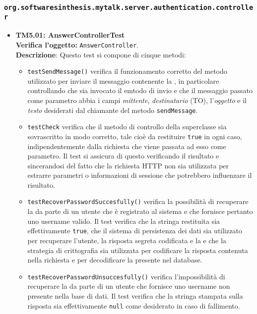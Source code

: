 \subsubsection{\texttt{org.softwaresinthesis.mytalk.server.authentication.controller}}
\begin{itemize}

\item \textbf{TM5.01: AnswerControllerTest}\\
\textbf{Verifica l'oggetto:} \texttt{AnswerController}.\\
\textbf{Descrizione}: %
Questo test si compone di cinque metodi:
\begin{itemize}

\item \texttt{testSendMessage()} verifica il funzionamento corretto del metodo utilizzato per inviare il messaggio contenente la , in particolare controllando che sia invocato il emtodo di invio e che il messaggio passato come parametro abbia i campi \textit{mittente}, \textit{destinatario} (TO), l'\textit{oggetto} e il \textit{testo} desiderati dal chiamante del metodo \texttt{sendMessage}.

\item \texttt{testCheck} verifica che il metodo di controllo della superclasse sia sovrascritto in modo corretto, tale cioè da restituire \texttt{true} in ogni caso, indipendentemente dalla richiesta che viene passata ad esso come parametro. Il test si assicura di questo verificando il risultato e sincerandosi del fatto che la richiesta HTTP non sia utilizzata per estrarre parametri o informazioni di sessione che potrebbero influenzare il risultato.

\item \texttt{testRecoverPasswordSuccesfully()} verifica la possibilità di recuperare la  da parte di un utente che è registrato al sistema e che fornisce pertanto uno username valido. Il test verifica che la stringa restituita sia effettivamente \texttt{true}, che il sistema di persistenza dei dati sia utilizzato per recuperare l'utente, la risposta segreta codificata e la  e che la strategia di crittografia sia utilizzata per codificare la risposta contenuta nella richiesta e per decodificare la  presente nel database.

\item \texttt{testRecoverPasswordUnsuccesfully()} verifica l'impossibilità di recuperare la  da parte di un utente che fornisce uno username non presente nella base di dati. Il test verifica che la stringa stampata sulla risposta sia effettivamente \texttt{null} come desiderato in caso di fallimento.


\end{itemize}
\end{itemize}
